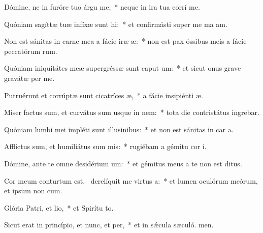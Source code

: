\item Dómine, ne in furóre tuo árgu me,~* neque in ira tua corrí me.
\item Quóniam sagíttæ tuæ infíxæ sunt hi:~* et confirmásti super me ma am.
\item Non est sánitas in carne mea a fácie iræ æ:~* non est pax óssibus meis a fácie peccatórum rum.
\item Quóniam iniquitátes meæ supergréssæ sunt caput um:~* et sicut onus grave gravátæ  per me.
\item Putruérunt et corrúptæ sunt cicatríces æ,~* a fácie insipiénti æ.
\item Miser factus sum, et curvátus sum usque in nem:~* tota die contristátus ingrebar.
\item Quóniam lumbi mei impléti sunt illusinibus:~* et non est sánitas in car a.
\item Afflíctus sum, et humiliátus sum mis:~* rugiébam a gémitu cor i.
\item Dómine, ante te omne desidérium um:~* et gémitus meus a te non est ditus.
\item Cor meum conturtum est,~\pscross{} derelíquit me virtus a:~* et lumen oculórum meórum, et ipsum non  cum.
\item Glória Patri, et lio,~* et Spirítu to.
\item Sicut erat in princípio, et nunc, et per,~* et in sǽcula sæculó. men.
